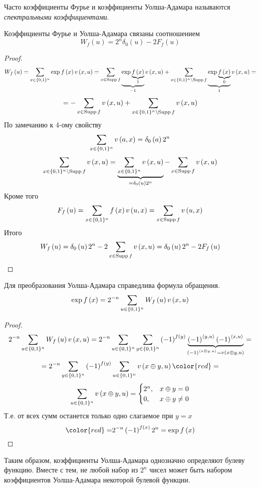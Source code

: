 \begin{definition}
Часто коэффициенты Фурье и коэффициенты Уолша-Адамара называются \emph{спектральными
коэффициентами}.\end{definition}
\begin{theorem}
Коэффициенты Фурье и Уолша-Адамара связаны соотношением
\[
W_{f}\left(u\right)=2^{n}\delta_{0}\left(u\right)-2F_{f}\left(u\right)
\]
\end{theorem}
\begin{proof}
\[
W_{f}\left(u\right)=\sum_{x\in \{0,1\}^n}\exp f\left(x\right)v\left(x,u\right)=\sum_{x\in\operatorname*{Supp} f}\underbrace{\exp\underbrace{f\left(x\right)}_{1}}_{-1}v\left(x,u\right)+\sum_{x\in \{0,1\}^n\setminus\operatorname*{Supp} f}\underbrace{\exp\underbrace{f\left(x\right)}_{0}}_{1}v\left(x,u\right)=
\]
\[
=-\sum_{x\in\operatorname*{Supp} f}v\left(x,u\right)+\sum_{x\in \{0,1\}^n\setminus\operatorname*{Supp} f}v\left(x,u\right)
\]
По замечанию к 4-ому свойству 
\[
\sum_{x\in \{0,1\}^n}v\left(a,x\right)=\delta_{0}\left(a\right)2^{n}
\]
\[
\sum_{x\in \{0,1\}^n\setminus\operatorname*{Supp} f}v\left(x,u\right)=\underbrace{\sum_{x\in \{0,1\}^n}v\left(x,u\right)}_{=\delta_{0}\left(u\right)2^{n}}-\sum_{x\in\operatorname*{Supp} f}v\left(x,u\right)
\]
Кроме того
\[
F_{f}\left(u\right)=\sum_{x\in \{0,1\}^n}f\left(x\right)v\left(u,x\right)=\sum_{x\in\operatorname*{Supp} f}v\left(u,x\right)
\]
Итого
\[
W_{f}\left(u\right)=\delta_{0}\left(u\right)2^{n}-2\sum_{x\in\operatorname*{Supp} f}v\left(x,u\right)=\delta_{0}\left(u\right)2^{n}-2F_{f}\left(u\right)
\]
\end{proof}
\begin{theorem}
\label{walsh_reverse}
Для преобразования Уолша-Адамара справедлива формула обращения.
\[
\exp f\left(x\right)=2^{-n}\sum_{u\in \{0,1\}^n}W_{f}\left(u\right)v\left(x,u\right)
\]
\end{theorem}
\begin{proof}
\[
2^{-n}\sum_{u\in \{0,1\}^n}W_{f}\left(u\right)v\left(x,u\right)=2^{-n}\sum_{u\in \{0,1\}^n}\sum_{y\in \{0,1\}^n}\left(-1\right)^{f\left(y\right)}\underbrace{\left(-1\right)^{\left\langle y,u\right\rangle }\left(-1\right)^{\left\langle x,u\right\rangle }}_{\left(-1\right)^{\left\langle x\oplus y,u\right\rangle }=v\left(x\oplus y,u\right)}=
\]
\[
=2^{-n}\sum_{y\in \tw^n}\left(-1\right)^{f\left(y\right)}\sum_{u\in \tw^n}v\left(x\oplus y,u\right){\color{red}=}
\]
\[
\sum_{u\in \{0,1\}^n}v\left(x\oplus y,u\right)=\begin{cases}
2^{n}, & x\oplus y=0\\
0, & x\oplus y\not=0
\end{cases}
\]
Т.е. от всех сумм останется только одно слагаемое при $y=x$
\[
{\color{red}=}2^{-n}\left(-1\right)^{f\left(x\right)}2^{n}=\exp f\left(x\right)
\]

\end{proof}
Таким образом, коэффициенты Уолша-Адамара однозначно определяют булеву
функцию. Вместе с тем, не любой набор из $2^{n}$ чисел может быть
набором коэффициентов Уолша-Адамара некоторой булевой функции. 

